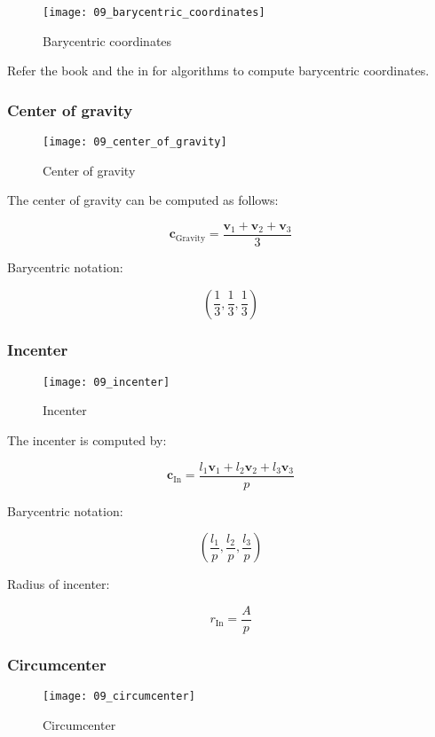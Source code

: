 \begin{figure}[H]
\centering
    \texttt{[image: 09\_barycentric\_coordinates]}
\caption{Barycentric coordinates}
\label{fig:barycentric-coordinates}
\end{figure}

Refer the book and the  in  for algorithms to compute barycentric coordinates.

\subsubsection{Center of gravity}

\begin{figure}[H]
\centering
    \texttt{[image: 09\_center\_of\_gravity]}
\caption{Center of gravity}
\label{fig:center-of-gravity}
\end{figure}

The center of gravity can be computed as follows:

$$\textbf{c}_{\text{Gravity}}= \frac{\textbf{v}_1+\textbf{v}_2+\textbf{v}_3}{3}$$

\noindent Barycentric notation: 

$$\left( \frac{1}{3}, \frac{1}{3}, \frac{1}{3} \right)$$

\subsubsection{Incenter}

\begin{figure}[H]
\centering
    \texttt{[image: 09\_incenter]}
\caption{Incenter}
\label{fig:incenter}
\end{figure}

The incenter is computed by:

$$\textbf{c}_{\text{In}} = \frac{l_1\textbf{v}_1 + l_2\textbf{v}_2 + l_3\textbf{v}_3}{p}$$

\noindent Barycentric notation:

$$\left(\frac{l_1}{p}, \frac{l_2}{p}, \frac{l_3}{p}\right)$$

\noindent Radius of incenter:

$$r_{\text{In}} = \frac{A}{p}$$

\subsubsection{Circumcenter}

\begin{figure}[H]
\centering
    \texttt{[image: 09\_circumcenter]}
\caption{Circumcenter}
\label{fig:circumcenter}
\end{figure}

